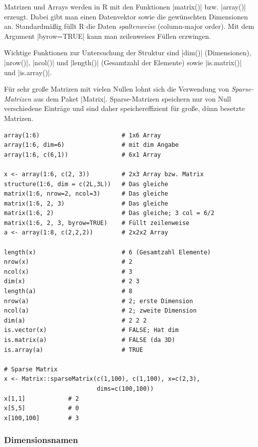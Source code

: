 \documentclass[10pt,twocolumn]{scrartcl}
\renewcommand{\lstinline}{\mycoloredinline}
\begin{document}
Matrizen und Arrays werden in R mit den Funktionen \lstinline|matrix()| bzw. \lstinline|array()| erzeugt. Dabei gibt man einen Datenvektor sowie die gewünschten Dimensionen an. Standardmäßig füllt R die Daten \emph{spaltenweise} (column-major order). Mit dem Argument \lstinline|byrow=TRUE| kann man zeilenweises Füllen erzwingen. 

Wichtige Funktionen zur Untersuchung der Struktur sind \lstinline|dim()| (Dimensionen), \lstinline|nrow()|, \lstinline|ncol()| und \lstinline|length()| (Gesamtzahl der Elemente) sowie \lstinline|is.matrix()| und \lstinline|is.array()|.

Für sehr große Matrizen mit vielen Nullen lohnt sich die Verwendung von \emph{Sparse-Matrizen} aus dem Paket \lstinline|Matrix|. Sparse-Matrizen speichern nur von Null verschiedene Einträge und sind daher speichereffizient für große, dünn besetzte Matrizen.

\begin{lstlisting}
array(1:6)                       # 1x6 Array
array(1:6, dim=6)                # mit dim Angabe
array(1:6, c(6,1))               # 6x1 Array

x <- array(1:6, c(2, 3))         # 2x3 Array bzw. Matrix
structure(1:6, dim = c(2L,3L))   # Das gleiche
matrix(1:6, nrow=2, ncol=3)      # Das gleiche
matrix(1:6, 2, 3)                # Das gleiche
matrix(1:6, 2)                   # Das gleiche; 3 col = 6/2
matrix(1:6, 2, 3, byrow=TRUE)    # Füllt zeilenweise
a <- array(1:8, c(2,2,2))        # 2x2x2 Array

length(x)                        # 6 (Gesamtzahl Elemente)
nrow(x)                          # 2
ncol(x)                          # 3
dim(x)                           # 2 3
length(a)                        # 8
nrow(a)                          # 2; erste Dimension
ncol(a)                          # 2; zweite Dimension
dim(a)                           # 2 2 2
is.vector(x)                     # FALSE; Hat dim
is.matrix(a)                     # FALSE (da 3D)
is.array(a)                      # TRUE

# Sparse Matrix
x <- Matrix::sparseMatrix(c(1,100), c(1,100), x=c(2,3),
                          dims=c(100,100))
x[1,1]            # 2
x[5,5]            # 0
x[100,100]        # 3
\end{lstlisting}


\subsubsection{Dimensionsnamen}
\end{document}

